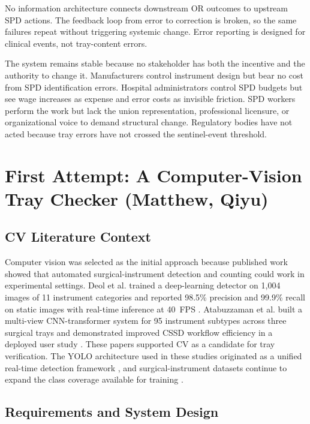 \documentclass[10pt,a4paper]{article}
\begin{document}
No information architecture connects downstream OR outcomes to upstream SPD
actions. The feedback loop from error to correction is broken, so the same
failures repeat without triggering systemic change. Error reporting is designed
for clinical events, not tray-content errors.

The system remains stable because no stakeholder has both the incentive and the
authority to change it. Manufacturers control instrument design but bear no cost
from SPD identification errors. Hospital administrators control SPD budgets but
see wage increases as expense and error costs as invisible friction. SPD
workers perform the work but lack the union representation, professional
licensure, or organizational voice to demand structural change. Regulatory
bodies have not acted because tray errors have not crossed the sentinel-event
threshold.


\section{First Attempt: A Computer-Vision Tray Checker \hfill {\normalfont\small (Matthew, Qiyu)}}
\label{sec:first-attempt-a-computer-vision-tray-checker}
\subsection{CV Literature Context}

Computer vision was selected as the initial approach because published work
showed that automated surgical-instrument detection and counting could work in
experimental settings. Deol et al. trained a deep-learning detector on 1,004
images of 11 instrument categories and reported 98.5\% precision and 99.9\%
recall on static images with real-time inference at 40~FPS
\cite{deol-et-al-2024}. Atabuzzaman et al.
built a multi-view CNN-transformer system for 95 instrument subtypes across
three surgical trays and demonstrated improved CSSD workflow efficiency in a
deployed user study
\cite{atabuzzaman-et-al-2025}. These papers supported CV as a candidate for tray
verification. The YOLO architecture used in these studies originated as a
unified real-time detection framework \cite{redmon-et-al-2016}, and
surgical-instrument datasets continue to expand the class coverage
available for training \cite{rodrigues-et-al-2022a}.
\subsection{Requirements and System Design}
\label{sec:requirements-and-system-design}
\end{document}
